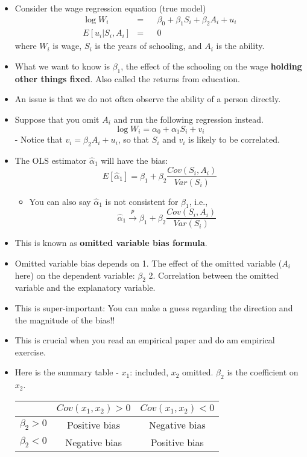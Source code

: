 \documentclass[]{book}
\providecommand{\tightlist}{%
  \setlength{\itemsep}{0pt}\setlength{\parskip}{0pt}}
\begin{document}
\begin{itemize}
\item
  Consider the wage regression equation (true model) \[
  \begin{aligned}
  \log W_{i}  &=&  & \beta_{0}+\beta_{1}S_{i}+\beta_{2}A_{i}+u_{i} \\
  E[u_{i}|S_{i},A_{i}]    &=& & 0
  \end{aligned}
  \] where \(W_{i}\) is wage, \(S_{i}\) is the years of schooling, and
  \(A_{i}\) is the ability.
\item
  What we want to know is \(\beta_1\), the effect of the schooling on
  the wage \textbf{holding other things fixed}. Also called the returns
  from education.
\item
  An issue is that we do not often observe the ability of a person
  directly.
\item
  Suppose that you omit \(A_i\) and run the following regression
  instead. \[
  \log W_{i}  =   \alpha_{0}+\alpha_{1} S_{i} + v_i 
  \] - Notice that \(v_i = \beta_2 A_i + u_i\), so that \(S_i\) and
  \(v_i\) is likely to be correlated.
\item
  The OLS estimator \(\hat\alpha_1\) will have the bias: \[ 
  E[\hat\alpha_1] = \beta_1 + \beta_2\frac{Cov(S_i, A_i)}{Var(S_i)} \]

  \begin{itemize}
  \tightlist
  \item
    You can also say \(\hat\alpha_1\) is not consistent for \(\beta_1\),
    i.e., \[
    \hat{\alpha}_{1}\overset{p}{\longrightarrow}\beta_{1}+\beta_{2}\frac{Cov(S_{i},A_{i})}{Var(S_{i})}
    \]
  \end{itemize}
\item
  This is known as \textbf{omitted variable bias formula}.
\item
  Omitted variable bias depends on 1. The effect of the omitted variable
  (\(A_i\) here) on the dependent variable: \(\beta_2\) 2. Correlation
  between the omitted variable and the explanatory variable.
\item
  This is super-important: You can make a guess regarding the direction
  and the magnitude of the bias!!
\item
  This is crucial when you read an empirical paper and do am empirical
  exercise.
\item
  Here is the summary table - \(x_1\): included, \(x_2\) omitted.
  \(\beta_2\) is the coefficient on \(x_2\).

  \begin{longtable}[]{@{}ccc@{}}
  \toprule
  & \(Cov(x_1, x_2) > 0\) & \(Cov(x_1, x_2) < 0\)\tabularnewline
  \midrule
  \endhead
  \(\beta_2 > 0\) & Positive bias & Negative bias\tabularnewline
  \(\beta_2 < 0\) & Negative bias & Positive bias\tabularnewline
  \bottomrule
  \end{longtable}
\end{itemize}
\end{document}
